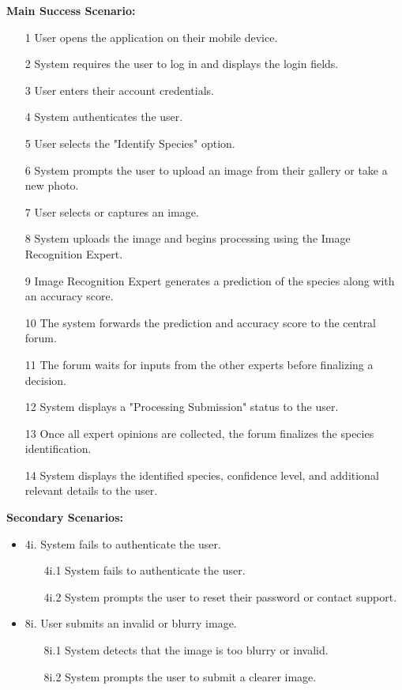 \documentclass[]{article}
\begin{document}
\begin{enumerate}[{\bf BE1.}]
\begin{enumerate}[{\bf VP1.}]
            \textbf{Main Success Scenario:}
            \begin{enumerate}
    \item[1] User opens the application on their mobile device.
    \item[2] System requires the user to log in and displays the login fields.
    \item[3] User enters their account credentials.
    \item[4] System authenticates the user.
    \item[5] User selects the "Identify Species" option.
    \item[6] System prompts the user to upload an image from their gallery or take a new photo.
    \item[7] User selects or captures an image.
    \item[8] System uploads the image and begins processing using the Image Recognition Expert.
    \item[9] Image Recognition Expert generates a prediction of the species along with an accuracy score.
    \item[10] The system forwards the prediction and accuracy score to the central forum.
    \item[11] The forum waits for inputs from the other experts before finalizing a decision.
    \item[12] System displays a "Processing Submission" status to the user.
    \item[13] Once all expert opinions are collected, the forum finalizes the species identification.
    \item[14] System displays the identified species, confidence level, and additional relevant details to the user.

    \end{enumerate}

    \textbf{Secondary Scenarios:}
    \begin{itemize}
    \item 4i. System fails to authenticate the user.
    \begin{enumerate}
        \item[4i.1] System fails to authenticate the user.
        \item[4i.2] System prompts the user to reset their password or contact support.
    \end{enumerate}
    
    \item 8i. User submits an invalid or blurry image.
    \begin{enumerate}
        \item[8i.1] System detects that the image is too blurry or invalid.
        \item[8i.2] System prompts the user to submit a clearer image.
    \end{enumerate}


\end{itemize}
\end{enumerate}
\end{enumerate}
\end{document}
